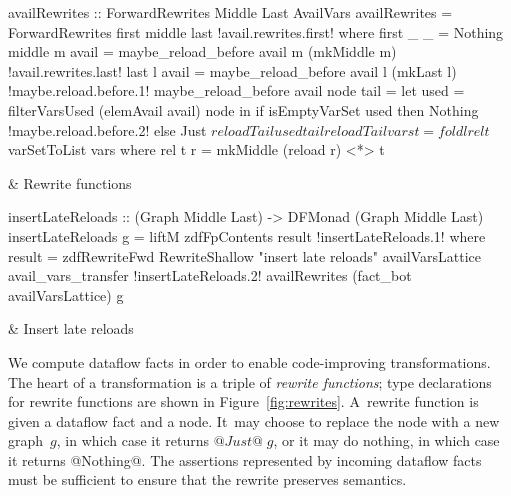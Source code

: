 \documentclass[blockstyle,preprint,natbib,nocopyrightspace]{sigplanconf}
\newcommand\figref[1]{Figure~\ref{fig:#1}}
\newcommand\figlabel[1]{\label{fig:#1}}
\begin{document}
\begin{figure*}
\begin{codetable}
\T\begin{code}
availRewrites :: ForwardRewrites Middle Last AvailVars
availRewrites = ForwardRewrites first middle last
!avail.rewrites.first!  where first _ _ = Nothing
        middle m avail = maybe_reload_before avail m (mkMiddle m)
!avail.rewrites.last!        last   l avail = maybe_reload_before avail l (mkLast l)
!maybe.reload.before.1!        maybe_reload_before avail node tail =
            let used = filterVarsUsed (elemAvail avail) node
            in  if isEmptyVarSet used then Nothing
!maybe.reload.before.2!                else Just $ reloadTail used tail
        reloadTail vars t = foldl rel t $ varSetToList vars
          where rel t r = mkMiddle (reload r) <*> t
\end{code}%
\B
& Rewrite \mbox{functions}\\
\hline

\T\begin{code}
insertLateReloads :: (Graph Middle Last) -> DFMonad (Graph Middle Last)
insertLateReloads g = liftM zdfFpContents result
!insertLateReloads.1!  where result = zdfRewriteFwd RewriteShallow "insert late reloads"
                               availVarsLattice avail_vars_transfer
!insertLateReloads.2!                               availRewrites (fact_bot availVarsLattice) g
\end{code}%
& Insert late reloads\\
\end{codetable}
\caption{Late-reload insertion, which relies on the analysis of \figref{avail}}
\figlabel{avail-rewrites}
\end{figure*}


We compute dataflow facts in order to enable code-improving
transformations.
The heart of a transformation is a triple of
\emph{rewrite functions};
type declarations for rewrite functions are
shown in \figref{rewrites}. 
%
A~rewrite function is given a dataflow fact and a node.
It~may choose to replace the node with a new graph~$g$, in which case it
returns $@Just@\;g$, or it may do nothing, in which case it returns @Nothing@.
The assertions represented by incoming dataflow facts must be
sufficient to ensure that the
rewrite preserves semantics.
\end{document}
